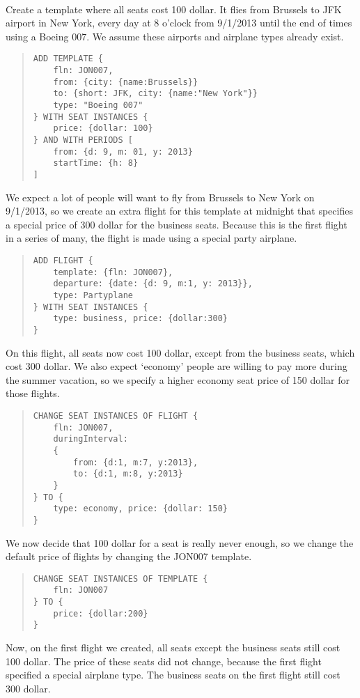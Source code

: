 \begin{texa}
  \\
  Create a template where all seats cost 100 dollar. It flies from Brussels to
  JFK airport in New York, every day at 8 o’clock from 9/1/2013 until the end of
  times using a Boeing 007. We assume these airports and airplane types already
  exist.
  \begin{quote}\begin{lstlisting}
ADD TEMPLATE {
    fln: JON007,
    from: {city: {name:Brussels}}
    to: {short: JFK, city: {name:"New York"}}
    type: "Boeing 007"
} WITH SEAT INSTANCES {
    price: {dollar: 100}
} AND WITH PERIODS [
    from: {d: 9, m: 01, y: 2013}
    startTime: {h: 8}
]
  \end{lstlisting}\end{quote}
  We expect a lot of people will want to fly from Brussels to New York on
  9/1/2013, so we create an extra flight for this template at midnight that
  specifies a special price of 300 dollar for the business seats. Because this
  is the first flight in a series of many, the flight is made using a special
  party airplane.
  \begin{quote}\begin{lstlisting}
ADD FLIGHT {
    template: {fln: JON007},
    departure: {date: {d: 9, m:1, y: 2013}},
    type: Partyplane
} WITH SEAT INSTANCES {
    type: business, price: {dollar:300}
}
  \end{lstlisting}\end{quote}
  On this flight, all seats now cost 100 dollar, except from the business seats,
  which cost 300 dollar.
  We also expect ‘economy’ people are willing to pay more during the summer
  vacation, so we specify a higher economy seat price of 150 dollar for those
  flights.
  \begin{quote}\begin{lstlisting}
CHANGE SEAT INSTANCES OF FLIGHT {
    fln: JON007,
    duringInterval:
    {
        from: {d:1, m:7, y:2013},
        to: {d:1, m:8, y:2013}
    }
} TO {
    type: economy, price: {dollar: 150}
}
  \end{lstlisting}\end{quote}
  We now decide that 100 dollar for a seat is really never enough, so we change
  the default price of flights by changing the JON007 template.
  \begin{quote}\begin{lstlisting}
CHANGE SEAT INSTANCES OF TEMPLATE {
    fln: JON007
} TO {
    price: {dollar:200}
}
  \end{lstlisting}\end{quote}
  Now, on the first flight we created, all seats except the business seats still
  cost 100 dollar. The price of these seats did not change, because the first
  flight specified a special airplane type. The business seats on the first
  flight still cost 300 dollar.
  

\end{texa}
